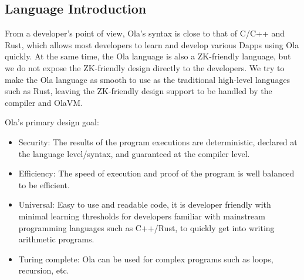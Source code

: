 \subsection{Language Introduction}\label{section: ola-lang-language-introduction}

From a developer’s point of view, Ola’s syntax is close to that of C/C++ and Rust, which allows most developers to learn and develop various Dapps using Ola quickly.
At the same time, the Ola language is also a ZK-friendly language, but we do not expose the ZK-friendly design directly to the developers.
We try to make the Ola language as smooth to use as the traditional high-level languages such as Rust, leaving the ZK-friendly design support to be handled by the compiler and OlaVM.

Ola's primary design goal:

    \begin{itemize}
        \item Security: The results of the program executions are deterministic, declared at the language level/syntax, and guaranteed at the compiler level.

        \item Efficiency: The speed of execution and proof of the program is well balanced to be efficient.

        \item Universal: Easy to use and readable code, it is developer friendly with minimal learning thresholds for developers familiar with mainstream programming languages such as C++/Rust, to quickly get into writing arithmetic programs.

        \item Turing complete: Ola can be used for complex programs such as loops, recursion, etc.
    \end{itemize}
